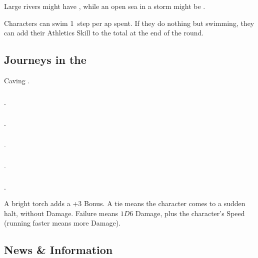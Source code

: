 \begin{multicols}{2}
Large rivers might have \tn[8], while an open sea in a storm might be \tn[12].

Characters can swim 1~\gls{step} per \gls{ap} spent.
If they do nothing but swimming, they can add their Athletics Skill to the total at the end of the round.

\subsection{Journeys in the }
Caving .

\subsubsection{}
.

\subsubsection{}
.

\subsubsection{}
.

\subsubsection{}
.

\subsubsection{}
.

%
A bright torch adds a +3 Bonus.
A tie means the character comes to a sudden halt, without Damage.
Failure means $1D6$ Damage, plus the character's Speed (running faster means more Damage).

\subsection{News \& Information}


\end{multicols}
